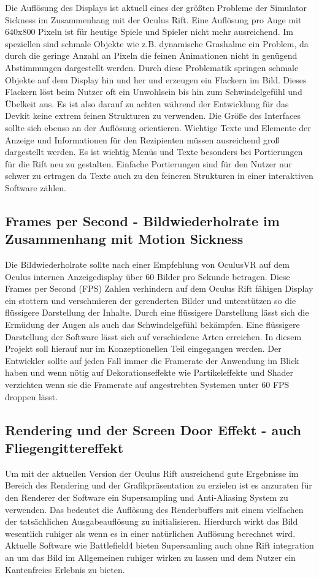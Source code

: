 \documentclass[pagesize, paper=a4, fontsize=12pt,titlepage=true, headings=small, headnosepline, abstractoff, liststotoc, nochapterprefix, plainheadsepline]{scrreprt}
\begin{document}
Die Auflösung des Displays ist aktuell eines der größten Probleme der Simulator Sickness im Zusammenhang mit der Oculus Rift.  Eine Auflösung pro Auge mit 640x800 Pixeln ist für heutige Spiele und Spieler nicht mehr ausreichend. Im speziellen sind schmale Objekte wie z.B. dynamische Grashalme ein Problem, da durch die geringe Anzahl an Pixeln die feinen Animationen nicht in genügend Abstimmungen dargestellt werden. Durch diese Problematik springen schmale Objekte auf dem Display hin und her und erzeugen ein Flackern im Bild. Dieses Flackern löst beim Nutzer oft ein Unwohlsein bis hin zum Schwindelgefühl und Übelkeit aus. Es ist also darauf zu achten während der Entwicklung für das Devkit keine extrem feinen Strukturen zu verwenden. Die Größe des Interfaces sollte sich ebenso an der Auflösung orientieren. Wichtige Texte und Elemente der Anzeige und Informationen für den Rezipienten müssen ausreichend groß dargestellt werden. Es ist wichtig Menüs und Texte besonders bei Portierungen für die Rift neu zu gestalten. Einfache Portierungen sind für den Nutzer nur schwer zu ertragen da Texte auch zu den feineren Strukturen in einer interaktiven Software zählen.

\subsection{Frames per Second - Bildwiederholrate im Zusammenhang mit Motion Sickness}
Die Bildwiederholrate sollte nach einer Empfehlung von OculusVR auf dem Oculus internen Anzeigedisplay über 60 Bilder pro Sekunde betragen. Diese Frames per Second (FPS) Zahlen verhindern auf dem Oculus Rift fähigen Display ein stottern und verschmieren der gerenderten Bilder und unterstützen so die flüssigere Darstellung der Inhalte. Durch eine flüssigere Darstellung lässt sich die Ermüdung der Augen als auch das Schwindelgefühl bekämpfen. Eine flüssigere Darstellung der Software lässt sich auf verschiedene Arten erreichen. In diesem Projekt soll hierauf nur im Konzeptionellen Teil eingegangen werden. Der Entwickler sollte auf jeden Fall immer die Framerate der Anwendung im Blick haben und wenn nötig auf Dekorationseffekte wie Partikeleffekte und Shader verzichten wenn sie die Framerate auf angestrebten Systemen unter 60 FPS droppen lässt.

\subsection{Rendering und der Screen Door Effekt - auch Fliegengittereffekt}
Um mit der aktuellen Version der Oculus Rift ausreichend gute Ergebnisse im Bereich des Rendering und der Grafikpräsentation zu erzielen ist es anzuraten für den Renderer der Software ein Supersampling und Anti-Aliasing System zu verwenden. Das bedeutet die Auflösung des Renderbuffers mit einem vielfachen der tatsächlichen Ausgabeauflösung zu initialisieren. Hierdurch wirkt das Bild wesentlich ruhiger als wenn es in einer natürlichen Auflösung berechnet wird. Aktuelle Software wie Battlefield4 bieten Supersamling auch ohne Rift integration an um das Bild im Allgemeinen ruhiger wirken zu lassen und dem Nutzer ein Kantenfreies Erlebnis zu bieten. 
\end{document}
